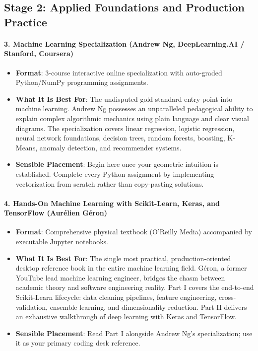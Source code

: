\subsection{Stage 2: Applied Foundations and Production Practice}

\paragraph{3. Machine Learning Specialization (Andrew Ng, DeepLearning.AI / Stanford, Coursera)}
\begin{itemize}
    \item \textbf{Format}: 3-course interactive online specialization with auto-graded Python/NumPy programming assignments.
    \item \textbf{What It Is Best For}: The undisputed gold standard entry point into machine learning. Andrew Ng possesses an unparalleled pedagogical ability to explain complex algorithmic mechanics using plain language and clear visual diagrams. The specialization covers linear regression, logistic regression, neural network foundations, decision trees, random forests, boosting, K-Means, anomaly detection, and recommender systems.
    \item \textbf{Sensible Placement}: Begin here once your geometric intuition is established. Complete every Python assignment by implementing vectorization from scratch rather than copy-pasting solutions.
\end{itemize}

\paragraph{4. Hands-On Machine Learning with Scikit-Learn, Keras, and TensorFlow (Aurélien Géron)}
\begin{itemize}
    \item \textbf{Format}: Comprehensive physical textbook (O'Reilly Media) accompanied by executable Jupyter notebooks.
    \item \textbf{What It Is Best For}: The single most practical, production-oriented desktop reference book in the entire machine learning field. Géron, a former YouTube lead machine learning engineer, bridges the chasm between academic theory and software engineering reality. Part I covers the end-to-end Scikit-Learn lifecycle: data cleaning pipelines, feature engineering, cross-validation, ensemble learning, and dimensionality reduction. Part II delivers an exhaustive walkthrough of deep learning with Keras and TensorFlow.
    \item \textbf{Sensible Placement}: Read Part I alongside Andrew Ng's specialization; use it as your primary coding desk reference.
\end{itemize}

